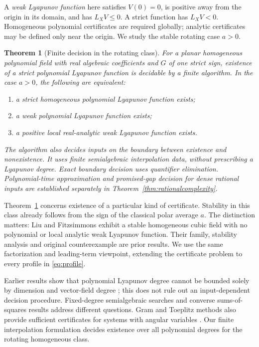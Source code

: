 \documentclass[11pt,a4paper]{article}
\newtheorem{theorem}{Theorem}[section]
\theoremstyle{remark}\newtheorem{remark}[theorem]{Remark}
\begin{document}
A \emph{weak Lyapunov function} here satisfies \(V(0)=0\), is positive
away from the origin in its domain, and has \(L_XV\leq0\).
A strict function has \(L_XV<0\). Homogeneous polynomial certificates
are required globally; analytic certificates may be defined only near
the origin. We study the stable rotating case \(a>0\).

\begin{theorem}[Finite decision in the rotating class]\label{thm:decision}
For a planar homogeneous polynomial field with real algebraic
coefficients and \(G\) of one strict sign, existence of a strict
polynomial Lyapunov function is decidable by a finite algorithm.
In the case \(a>0\), the following are equivalent:
\begin{enumerate}[label=(\roman*)]
\item a strict homogeneous polynomial Lyapunov function exists;
\item a weak polynomial Lyapunov function exists;
\item a positive local real-analytic weak Lyapunov function exists.
\end{enumerate}
The algorithm also decides inputs on the boundary between existence
and nonexistence. It uses finite semialgebraic interpolation data,
without prescribing a Lyapunov degree. Exact boundary decision uses
quantifier elimination. Polynomial-time approximation and promised-gap
decision for dense rational inputs are established separately in
Theorem~\ref{thm:rationalcomplexity}.
\end{theorem}

Theorem~\ref{thm:decision} concerns existence of a particular kind of
certificate. Stability in this class already follows from the sign
of the classical polar average \(a\). The distinction matters:
Liu and Fitzsimmons \cite{liu} exhibit a stable homogeneous cubic
field with no polynomial or local analytic weak Lyapunov function.
Their family, stability analysis and original counterexample are
prior results. We use the same factorization and leading-term
viewpoint, extending the certificate problem to every profile in
\eqref{eq:profile}.

Earlier results show that polynomial Lyapunov degree cannot be
bounded solely by dimension and vector-field degree
\cite{ahmadi-parrilo,ahmadi-khadir}; this does not rule out an
input-dependent decision procedure. Fixed-degree semialgebraic
searches and converse sums-of-squares results address different
questions. Gram and Toeplitz methods also provide sufficient
certificates for systems with angular variables \cite{tripathi}.
Our finite interpolation formulation decides existence over all
polynomial degrees for the rotating homogeneous class.
\end{document}

